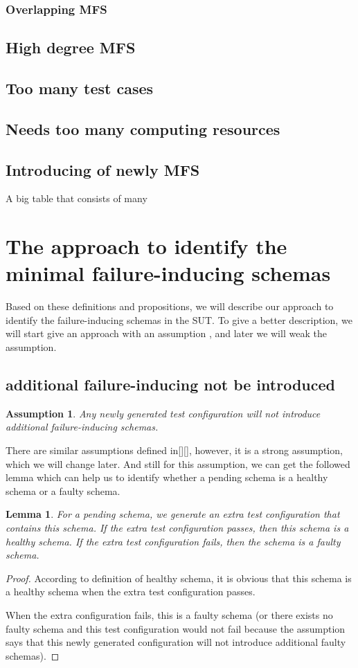 \documentclass[10pt,journal,cspaper,compsoc]{IEEEtran}
\begin{document}
\subsubsection{Overlapping MFS}
\subsection{High degree MFS}
\subsection{Too many test cases}
\subsection{Needs too many computing resources}
\subsection{Introducing of newly MFS}

A big table that consists of many


\section{The approach to identify the minimal failure-inducing schemas}\label{sec:app}
Based on these definitions and propositions, we will describe our approach to identify the failure-inducing schemas in the SUT. To give a better description, we will start give an approach with an assumption , and later we will weak the assumption.

\subsection{additional failure-inducing not be introduced}
\newtheorem{assumption}{Assumption}
\begin{assumption}
Any newly generated test configuration will not introduce additional failure-inducing schemas.
\end{assumption}

There are similar assumptions defined in[][], however, it is a strong assumption, which we will change later. And still for this assumption, we can get the followed lemma which can help us to identify whether a pending schema is a healthy schema or a faulty schema.
\newtheorem{lemma}{Lemma}
\begin{lemma}
For a pending schema, we generate an extra test configuration that contains this schema. If the extra test configuration passes, then this schema is a healthy schema. If the extra test configuration fails, then the schema is a faulty schema.
\end{lemma}
\begin{proof}
According to definition of healthy schema, it is obvious that this schema is a healthy schema when the extra test configuration passes.

When the extra configuration fails, this is a faulty schema (or there exists no faulty schema and this test configuration would not fail because the assumption says that this newly generated configuration will not introduce additional faulty schemas).
\end{proof}
\end{document}
